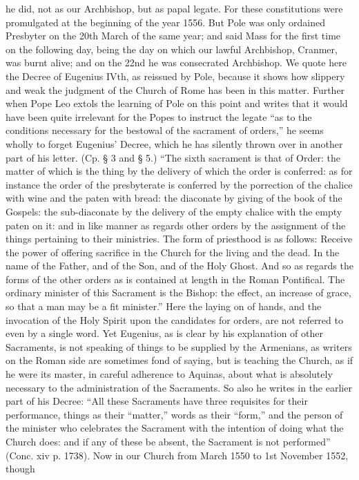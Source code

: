 he did, not as our Archbishop, but as papal legate. For these constitutions were promulgated at the beginning of the year 1556. But Pole was only ordained Presbyter on the 20th March of the same year; and said Mass for the first time on the following day, being the day on which our lawful Archbishop, Cranmer, was burnt alive; and on the 22nd he was consecrated Archbishop. We quote here the Decree of Eugenius IVth, as reissued by Pole, because it shows how slippery and weak the judgment of the Church of Rome has been in this matter. Further when Pope Leo extols the learning of Pole on this point and writes that it would have been quite irrelevant for the Popes to instruct the legate “as to the conditions necessary for the bestowal of the sacrament of orders,” he seems wholly to forget Eugenius’ Decree, which he has silently thrown over in another part of his letter. (Cp. § 3 and § 5.) “The sixth sacrament is that of Order: the matter of which is the thing by the delivery of which the order is conferred: as for instance the order of the presbyterate is conferred by the porrection of the chalice with wine and the paten with bread: the diaconate by giving of the book of the Gospels: the sub-diaconate by the delivery of the empty chalice with the empty paten on it: and in like manner as regards other orders by the assignment of the things pertaining to their ministries. The form of priesthood is as follows: Receive the power of offering sacrifice in the Church for the living and the dead. In the name of the Father, and of the Son, and of the Holy Ghost. And so as regards the forms of the other orders as is contained at length in the Roman Pontifical. The ordinary minister of this Sacrament is the Bishop: the effect, an increase of grace, so that a man may be a fit minister.” Here the laying on of hands, and the invocation of the Holy Spirit upon the candidates for orders, are not referred to even by a single word. Yet Eugenius, as is clear by his explanation of other Sacraments, is not speaking of things to be supplied by the Armenians, as writers on the Roman side are sometimes fond of saying, but is teaching the Church, as if he were its master, in careful adherence to Aquinas, about what is absolutely necessary to the administration of the Sacraments. So also he writes in the earlier part of his Decree: “All these Sacraments have three requisites for their performance, things as their “matter,” words as their “form,” and the person of the minister who celebrates the Sacrament with the intention of doing what the Church does: and if any of these be absent, the Sacrament is not performed” (Conc. xiv p. 1738). Now in our Church from March 1550 to 1st November 1552, though

